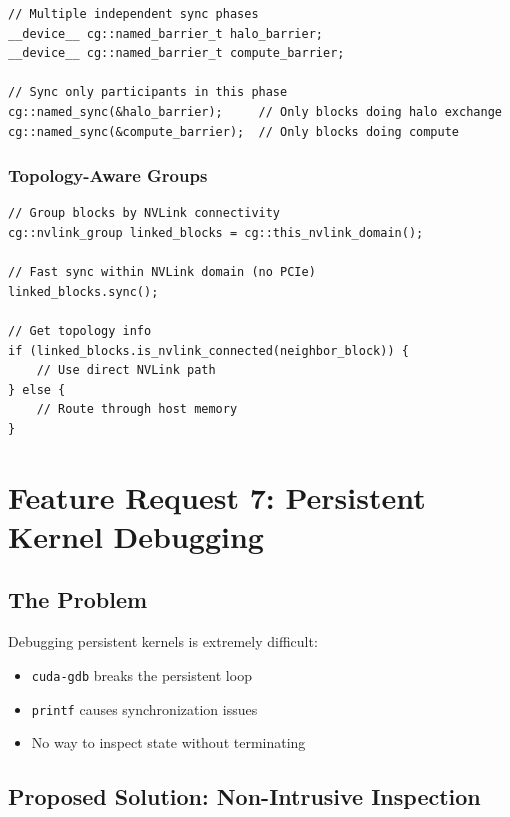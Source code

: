 \documentclass[11pt,a4paper]{article}
\begin{document}
\begin{lstlisting}[style=cstyle]
// Multiple independent sync phases
__device__ cg::named_barrier_t halo_barrier;
__device__ cg::named_barrier_t compute_barrier;

// Sync only participants in this phase
cg::named_sync(&halo_barrier);     // Only blocks doing halo exchange
cg::named_sync(&compute_barrier);  // Only blocks doing compute
\end{lstlisting}

\subsubsection{Topology-Aware Groups}

\begin{lstlisting}[style=cstyle]
// Group blocks by NVLink connectivity
cg::nvlink_group linked_blocks = cg::this_nvlink_domain();

// Fast sync within NVLink domain (no PCIe)
linked_blocks.sync();

// Get topology info
if (linked_blocks.is_nvlink_connected(neighbor_block)) {
    // Use direct NVLink path
} else {
    // Route through host memory
}
\end{lstlisting}

\newpage

\section{Feature Request 7: Persistent Kernel Debugging}

\subsection{The Problem}

Debugging persistent kernels is extremely difficult:
\begin{itemize}[leftmargin=*]
    \item \texttt{cuda-gdb} breaks the persistent loop
    \item \texttt{printf} causes synchronization issues
    \item No way to inspect state without terminating
\end{itemize}

\subsection{Proposed Solution: Non-Intrusive Inspection}
\end{document}
